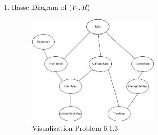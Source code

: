 \documentclass[12pt]{article}
\begin{document}
\begin{enumerate}
	\item Hasse Diagram of (\(V_1,R\))
	\begin{figure}[htbp]
		\centering
		\includegraphics[width=0.60\textwidth]{SOEN331_A1_P613.PNG}
		\caption{Visualization Problem 6.1.3}
	\end{figure}
	
\end{enumerate}
\end{document}
